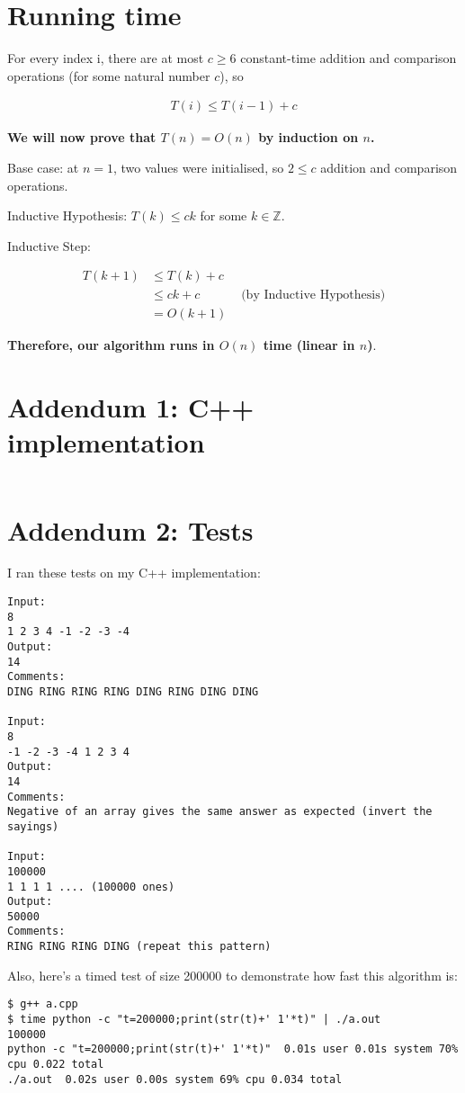 \documentclass{article}
\begin{document}
\section{Running time}

For every index i, there are at most $c \geq 6$ constant-time addition and comparison operations (for some natural number $c$), so

\begin{align*}
    T(i) \leq T(i-1) + c
\end{align*}

\textbf{We will now prove that $T(n) = O(n)$ by induction on $n$.}

Base case: at $n=1$, two values were initialised, so $2 \leq c$ addition and comparison operations.

Inductive Hypothesis: $T(k) \leq ck$ for some $k \in \mathbb{Z}$.

Inductive Step:

\begin{align*}
    T(k+1) &\leq T(k) + c \\
           &\leq ck + c &\text{ (by Inductive Hypothesis)} \\
           &= O(k+1)
\end{align*}

\textbf{Therefore, our algorithm runs in $O(n)$ time (linear in $n$)}.


\section{Addendum 1: C++ implementation}
\inputminted{cpp}{/home/rachit/prog/a.cpp}
\section{Addendum 2: Tests}
I ran these tests on my C++ implementation:

\begin{verbatim}
Input:
8
1 2 3 4 -1 -2 -3 -4
Output:
14
Comments:
DING RING RING RING DING RING DING DING

Input: 
8
-1 -2 -3 -4 1 2 3 4
Output:
14
Comments:
Negative of an array gives the same answer as expected (invert the sayings)

Input: 
100000
1 1 1 1 .... (100000 ones)
Output: 
50000
Comments:
RING RING RING DING (repeat this pattern)
\end{verbatim}

Also, here's a timed test of size 200000 to demonstrate how fast this algorithm is:

\begin{verbatim}
$ g++ a.cpp
$ time python -c "t=200000;print(str(t)+' 1'*t)" | ./a.out
100000
python -c "t=200000;print(str(t)+' 1'*t)"  0.01s user 0.01s system 70% cpu 0.022 total
./a.out  0.02s user 0.00s system 69% cpu 0.034 total
\end{verbatim}
\end{document}
